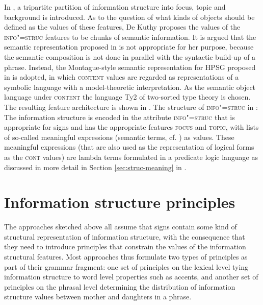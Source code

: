 \documentclass[output=paper
	        ,collection
	        ,collectionchapter
 	        ,biblatex
                ,babelshorthands
                ,newtxmath
                ,draftmode
                ,colorlinks, citecolor=brown
]{langscibook}
\begin{document}
In \cite{deKuthy2002a}, a tripartite partition of information
structure into focus, topic and background is introduced. As to the
question of what kinds of objects should be defined as the values of
these features, De Kuthy proposes the values of the
\textsc{info"=struc} features to be chunks of semantic information.  It
is argued that the semantic representation proposed in \cite{ps2} is
not appropriate for her purpose, because the semantic composition is
not done in parallel with the syntactic build-up of a phrase. Instead,
the Montague-style \citep[cf.\ ][]{DWP81a-u} semantic representation for HPSG proposed in
\cite{Sailer2000a} is adopted, in which \textsc{content} values are
regarded as representations of a symbolic language with a
model-theoretic interpretation. As the semantic object language under
\textsc{content} the language Ty2 \citep[cf.\ ][]{Gallin75a-u} of
two-sorted type theory is chosen. The resulting feature architecture
is shown in .
\ea
The structure of \textsc{info"=struc} in \cite[165]{deKuthy2002a}:\\
\leavevmode
{}
    \label{fig:info-struc}
\z
The information structure is encoded in the attribute
\textsc{info"=struc} that is appropriate for signs and has the
appropriate features \textsc{focus} and \textsc{topic}, with lists of
so-called meaningful expressions (semantic terms, cf.
\citealt{Sailer2000a}) as values. These meaningful expressions (that are
also used as the representation of logical forms as the \textsc{cont}
values) are lambda terms formulated in a predicate logic language as
discussed in more detail in Section \ref{sec:struc-meaning} in 
.

\section{Information structure principles}
\label{sec:inf-principles}

The approaches sketched above all assume that signs contain some kind
of structural representation of information structure, with the
consequence that they need to introduce principles that constrain the
values of the information structural features. Most approaches thus
formulate two types of principles as part of their grammar fragment:
one set of principles on the lexical level tying information structure to word
level properties such as accents, and another set of principles on the
phrasal level determining the distribution of information structure
values between mother and daughters in a phrase.
\end{document}
